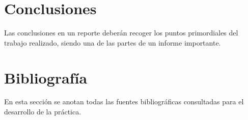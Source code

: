 \documentclass[%
 reprint,
 amsmath,amssymb,
 aps,
]{revtex4-2}
\begin{document}
\section{Conclusiones}
Las conclusiones en un reporte deberán recoger los puntos primordiales del trabajo realizado, siendo una de las partes de un informe importante.

\section{Bibliografía}

En esta sección se anotan todas las fuentes bibliográficas consultadas para el desarrollo de la práctica.

\end{document}
